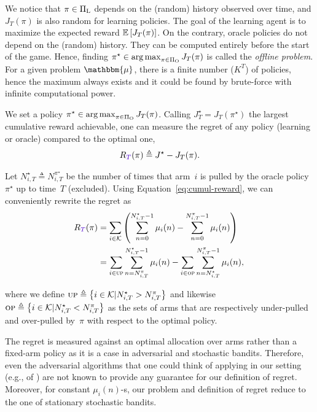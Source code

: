 We notice that $\pi \in \Pi_{\rm L}$ depends on the (random) history observed over time, and $J_T(\pi)$ is also random for learning policies. The goal of the learning agent is to maximize the expected reward $\mathbb{E}\left[J_T(\pi)\right]$.
%
On the contrary,  oracle policies do not depend on the (random) history. They can be computed entirely before the start of the game. Hence, finding $\pi^\star \in \operatorname*{arg\,max}_{\pi \in \Pi_{\rm O}} J_T(\pi)$ is called the \textit{offline problem}. For a given problem $\mathbbm{\mu}$, there is a finite number ($K^T$) of policies, hence the maximum always exists and it could be found by brute-force with infinite computational power.

We set a policy $\pi^\star\in \operatorname*{arg\,max}_{\pi \in \Pi_{\rm O}} J_T(\pi)$. Calling $J_T^\star = J_T(\pi^\star)$ the largest cumulative reward achievable, one can measure the regret of any policy (learning or oracle) compared to the optimal one, 
\begin{align}\label{eq:regret}
\regret(\pi) \triangleq J^\star - J_T(\pi).
\end{align}

Let $N_{i,T}^\star \triangleq N_{i,T}^{\pi^\star}$ be the number of times that arm~$i$ is pulled by the oracle policy $\pi^\star$ up to time~$T$ (excluded).  Using Equation~\ref{eq:cumul-reward},  we can conveniently rewrite the regret as
%
\begin{align}
\!\regret(\pi) &= \sum_{i\in\possibleArms}\left( \sum_{n=0}^{N_{i,T}^\star-1}  \reward_{i}(n)  - \sum_{n=0}^{N_{i,T}^\pi-1}  \mu_{i}(n) \right) \nonumber\\ 
& = \sum_{i \in \underpullSet}\sum_{n=N_{i, T}^{\pi}}^{N_{i, T}^{\star}-1} \mu_i(n) - \sum_{i \in \overpullSet} \sum_{n=N_{i, T}^{\star}}^{N_{i, T}^{\pi}-1} \mu_i(n),\label{eq:regret2}
\end{align}

where we define $\textsc{up} \triangleq \left\{ i \in \mathcal{K} | N_{i, T}^{\star} > N_{i, T}^{\pi} \right\}$ and likewise $\textsc{op} \triangleq \left\{ i\in \mathcal{K} | N_{i, T}^{\star} < N_{i, T}^{\pi}\right\}$ as the sets of arms that are respectively under-pulled and over-pulled by~$\pi$ with respect to the optimal policy.


\begin{remark}
The regret is measured against an optimal allocation over arms rather than a fixed-arm policy as it is a case in adversarial and stochastic bandits. Therefore, even the adversarial algorithms that one could think of applying in our setting (e.g., \EXP of \citet{auer2002finite}) are not known to provide any guarantee for our definition of regret. Moreover, for constant $\mu_i(n)$-s, our problem and definition of regret reduce to the one of stationary stochastic bandits. 
\end{remark}


